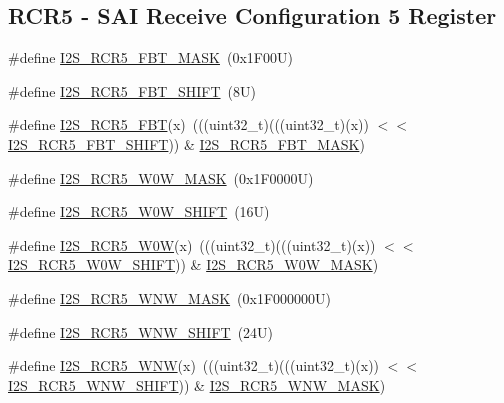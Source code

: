 \subsection*{R\+C\+R5 -\/ S\+AI Receive Configuration 5 Register}
\begin{DoxyCompactItemize}
\item 
\#define \mbox{\hyperlink{group___i2_s___register___masks_ga54847f1139b421f0f0df7af775a11996}{I2\+S\+\_\+\+R\+C\+R5\+\_\+\+F\+B\+T\+\_\+\+M\+A\+SK}}~(0x1\+F00\+U)
\item 
\#define \mbox{\hyperlink{group___i2_s___register___masks_gabe8f4784a8f4ce3235e31483d0b6e5f4}{I2\+S\+\_\+\+R\+C\+R5\+\_\+\+F\+B\+T\+\_\+\+S\+H\+I\+FT}}~(8\+U)
\item 
\#define \mbox{\hyperlink{group___i2_s___register___masks_ga833530d170a05c8c6e3812b44bd01bc4}{I2\+S\+\_\+\+R\+C\+R5\+\_\+\+F\+BT}}(x)~(((uint32\+\_\+t)(((uint32\+\_\+t)(x)) $<$$<$ \mbox{\hyperlink{group___i2_s___register___masks_gabe8f4784a8f4ce3235e31483d0b6e5f4}{I2\+S\+\_\+\+R\+C\+R5\+\_\+\+F\+B\+T\+\_\+\+S\+H\+I\+FT}})) \& \mbox{\hyperlink{group___i2_s___register___masks_ga54847f1139b421f0f0df7af775a11996}{I2\+S\+\_\+\+R\+C\+R5\+\_\+\+F\+B\+T\+\_\+\+M\+A\+SK}})
\item 
\#define \mbox{\hyperlink{group___i2_s___register___masks_ga21ac7b9671ee42b3ff23e61fbc762bd6}{I2\+S\+\_\+\+R\+C\+R5\+\_\+\+W0\+W\+\_\+\+M\+A\+SK}}~(0x1\+F0000\+U)
\item 
\#define \mbox{\hyperlink{group___i2_s___register___masks_ga1b13ac40203b26b4adeb037896cbb88e}{I2\+S\+\_\+\+R\+C\+R5\+\_\+\+W0\+W\+\_\+\+S\+H\+I\+FT}}~(16\+U)
\item 
\#define \mbox{\hyperlink{group___i2_s___register___masks_gaf0bbc5e0cd36dc9f547c58d21dcd98e5}{I2\+S\+\_\+\+R\+C\+R5\+\_\+\+W0W}}(x)~(((uint32\+\_\+t)(((uint32\+\_\+t)(x)) $<$$<$ \mbox{\hyperlink{group___i2_s___register___masks_ga1b13ac40203b26b4adeb037896cbb88e}{I2\+S\+\_\+\+R\+C\+R5\+\_\+\+W0\+W\+\_\+\+S\+H\+I\+FT}})) \& \mbox{\hyperlink{group___i2_s___register___masks_ga21ac7b9671ee42b3ff23e61fbc762bd6}{I2\+S\+\_\+\+R\+C\+R5\+\_\+\+W0\+W\+\_\+\+M\+A\+SK}})
\item 
\#define \mbox{\hyperlink{group___i2_s___register___masks_gab6d2caff41f65c7c2c24510803d8000f}{I2\+S\+\_\+\+R\+C\+R5\+\_\+\+W\+N\+W\+\_\+\+M\+A\+SK}}~(0x1\+F000000\+U)
\item 
\#define \mbox{\hyperlink{group___i2_s___register___masks_gade327b408882d6b24c668c4d7d4c52c8}{I2\+S\+\_\+\+R\+C\+R5\+\_\+\+W\+N\+W\+\_\+\+S\+H\+I\+FT}}~(24\+U)
\item 
\#define \mbox{\hyperlink{group___i2_s___register___masks_ga2fe4fc2933c0338095194c6c09bb0512}{I2\+S\+\_\+\+R\+C\+R5\+\_\+\+W\+NW}}(x)~(((uint32\+\_\+t)(((uint32\+\_\+t)(x)) $<$$<$ \mbox{\hyperlink{group___i2_s___register___masks_gade327b408882d6b24c668c4d7d4c52c8}{I2\+S\+\_\+\+R\+C\+R5\+\_\+\+W\+N\+W\+\_\+\+S\+H\+I\+FT}})) \& \mbox{\hyperlink{group___i2_s___register___masks_gab6d2caff41f65c7c2c24510803d8000f}{I2\+S\+\_\+\+R\+C\+R5\+\_\+\+W\+N\+W\+\_\+\+M\+A\+SK}})
\end{DoxyCompactItemize}
